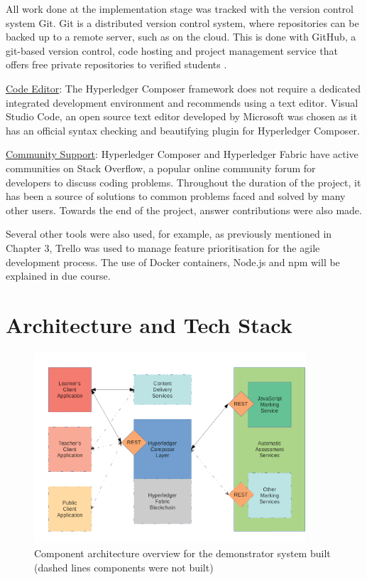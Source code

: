 All work done at the implementation stage was tracked with the version control system Git.
Git is a distributed version control system, where repositories can be backed up to a remote server,
such as on the cloud. This is done with GitHub, a git-based version control, code hosting and
project management service that offers free private repositories to verified students \citep{github2018education}.

\underline{Code Editor}: The Hyperledger Composer framework does not require a dedicated integrated
development environment and recommends using a text editor. Visual Studio Code, an open source text editor developed
by Microsoft was chosen as it has an official syntax checking and beautifying plugin for Hyperledger Composer.

\underline{Community Support}: Hyperledger Composer and Hyperledger Fabric have active communities on Stack Overflow,
a popular online community forum for developers to discuss coding problems. Throughout the duration of the project,
it has been a source of solutions to common problems faced and solved by many other users. Towards the end of the project,
answer contributions were also made.

Several other tools were also used, for example, as previously mentioned in Chapter 3, Trello was used to manage
feature prioritisation for the agile development process. The use of Docker containers, Node.js and npm 
will be explained in due course.

\section{Architecture and Tech Stack}

\begin{figure}[!ht]
	\centering
	\includegraphics[width=0.9\textwidth]{architecture}
	\caption[Demonstrator Component Architecture]
	{Component architecture overview for the demonstrator system built (dashed lines components were not built)}
	\label{fig:architecture}
\end{figure}

